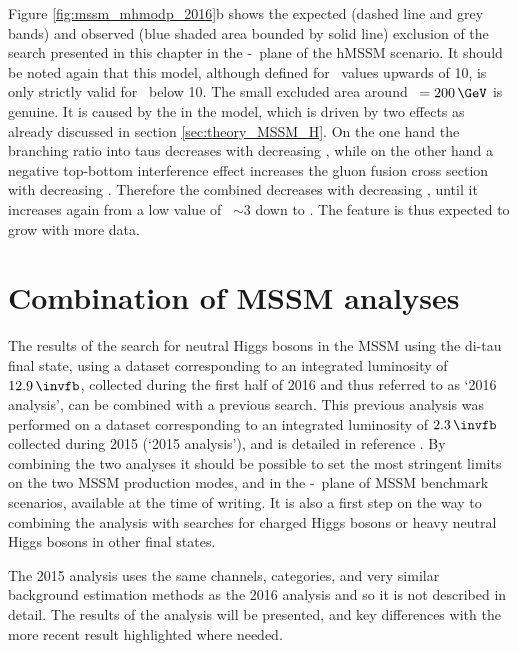 Figure \ref{fig:mssm_mhmodp_2016}b shows the expected (dashed line and grey bands)
and observed (blue shaded area bounded by solid line) exclusion of the search
presented in this chapter in the \mA-\tanb~plane of the hMSSM scenario. 
It should be noted again that this model, although defined for \tanb~values
upwards of 10, is only strictly valid for \tanb~below 10.
The small excluded area around \mA~$=200\,\GeV$ is genuine. It is caused by the 
\xsbr in the model, which is driven by
two effects as already discussed in section \ref{sec:theory_MSSM_H}. On the one hand the branching ratio into taus decreases with decreasing
\tanb, while on the other hand a negative top-bottom interference effect increases the
gluon fusion cross section with decreasing \tanb. Therefore the
combined \xsbr decreases with decreasing \tanb, until it
increases again from a low value of \tanb~$\sim 3$ down to . The feature is 
thus expected to grow with more data.

\chapter{Combination of MSSM analyses}
\label{sec:mssm_combination}
The results of the search for neutral Higgs bosons in the \ac{MSSM} using the di-tau
final state, using a dataset
corresponding to an integrated luminosity of $12.9\,\invfb$, collected during the
first half of 2016 and thus referred to as `2016 analysis', can be combined 
with a previous search. This previous analysis
was performed on a dataset corresponding to an integrated luminosity of $2.3\,\invfb$ 
collected during 2015 (`2015 analysis'), and is detailed in reference \cite{CMS-PAS-HIG-16-006}.
By combining the two analyses it should be possible to set the most stringent
limits on the two \ac{MSSM} production modes, and in the \mA-\tanb~plane of 
\ac{MSSM} benchmark scenarios, available at the time of writing. It is also
a first step on the way to combining the \AHtotautau analysis with
searches for charged Higgs bosons or heavy neutral Higgs bosons in 
other final states. 

The 2015 analysis uses the same channels, categories, and very
similar background estimation methods as the 2016 analysis and so
it is not described in detail. The results of the analysis will 
be presented, and key differences with the more recent result highlighted
where needed.

